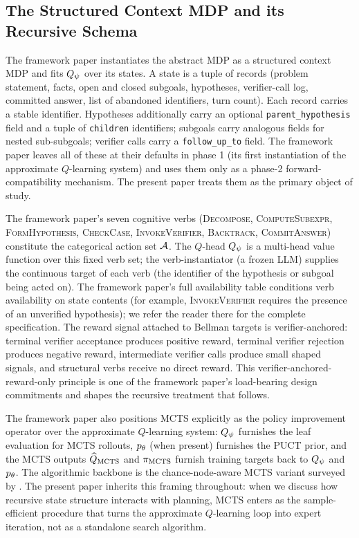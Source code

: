 \subsection{The Structured Context MDP and its Recursive Schema}
\label{sec:background-context-mdp}

The framework paper instantiates the abstract MDP as a structured
context MDP and fits $Q_{\psi}$ over its states. A state is a tuple of
records (problem statement, facts, open and closed subgoals,
hypotheses, verifier-call log, committed answer, list of abandoned
identifiers, turn count). Each record carries a stable identifier.
Hypotheses additionally carry an optional \texttt{parent\_hypothesis}
field and a tuple of \texttt{children} identifiers; subgoals carry
analogous fields for nested sub-subgoals; verifier calls carry a
\texttt{follow\_up\_to} field. The framework paper leaves all of these
at their defaults in phase 1 (its first instantiation of the
approximate $Q$-learning system) and uses them only as a phase-2
forward-compatibility mechanism. The present paper treats them as the
primary object of study.

The framework paper's seven cognitive verbs (\textsc{Decompose},
\textsc{ComputeSubexpr}, \textsc{FormHypothesis}, \textsc{CheckCase},
\textsc{InvokeVerifier}, \textsc{Backtrack}, \textsc{CommitAnswer})
constitute the categorical action set $\mathcal{A}$. The $Q$-head $Q_{\psi}$
is a multi-head value function over this fixed verb set; the
verb-instantiator (a frozen LLM) supplies the continuous target of
each verb (the identifier of the hypothesis or subgoal being acted
on). The framework paper's full availability table conditions verb
availability on state contents (for example, \textsc{InvokeVerifier}
requires the presence of an unverified hypothesis); we refer the
reader there for the complete specification. The reward signal
attached to Bellman targets is verifier-anchored: terminal verifier
acceptance produces positive reward, terminal verifier rejection
produces negative reward, intermediate verifier calls produce small
shaped signals, and structural verbs receive no direct reward. This
verifier-anchored-reward-only principle is one of the framework
paper's load-bearing design commitments and shapes the recursive
treatment that follows.

The framework paper also positions MCTS explicitly as the policy
improvement operator over the approximate $Q$-learning system: $Q_{\psi}$
furnishes the leaf evaluation for MCTS rollouts, $p_{\theta}$ (when
present) furnishes the PUCT prior, and the MCTS outputs $\widehat{Q}_{\mathrm{MCTS}}$ and
$\pi_{\mathrm{MCTS}}$ furnish training targets back to $Q_{\psi}$ and $p_{\theta}$. The
algorithmic backbone is the chance-node-aware MCTS variant surveyed by
\citet{browne2012survey}. The present paper inherits this framing
throughout: when we discuss how recursive state structure interacts
with planning, MCTS enters as the sample-efficient procedure that
turns the approximate $Q$-learning loop into expert iteration, not as
a standalone search algorithm.


